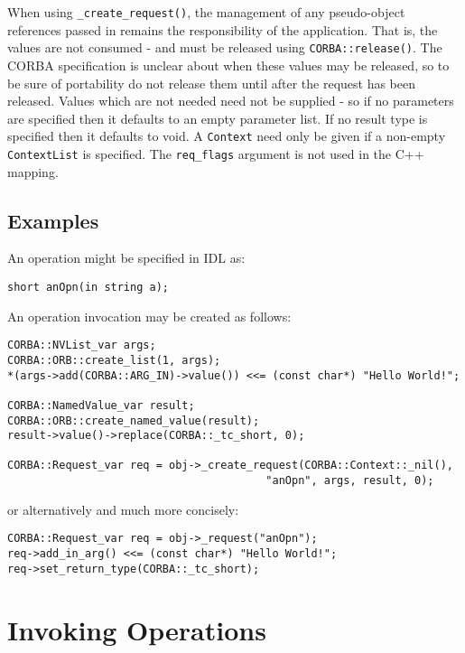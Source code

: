 \documentclass[11pt,twoside,onecolumn]{book}
\begin{document}
When using {\tt \_create\_request()}, the management of any pseudo-object
references passed in remains the responsibility of the application. That is,
the values are not consumed - and must be released using
{\tt CORBA::release()}. The CORBA specification is unclear about when these
values may be released, so to be sure of portability do not release them
until after the request has been released.
Values which are not needed need not be supplied - so if no parameters are
specified then it defaults to an empty parameter list. If no result type is
specified then it defaults to void. A {\tt Context} need only be given if
a non-empty {\tt ContextList} is specified. The {\tt req\_flags} argument
is not used in the C++ mapping.


\subsection{Examples}

An operation might be specified in IDL as:

{\small \begin{verbatim}
short anOpn(in string a);
\end{verbatim}}

\noindent{}An operation invocation may be created as follows:

{\small \begin{verbatim}
CORBA::NVList_var args;
CORBA::ORB::create_list(1, args);
*(args->add(CORBA::ARG_IN)->value()) <<= (const char*) "Hello World!";

CORBA::NamedValue_var result;
CORBA::ORB::create_named_value(result);
result->value()->replace(CORBA::_tc_short, 0);

CORBA::Request_var req = obj->_create_request(CORBA::Context::_nil(),
                                        "anOpn", args, result, 0);
\end{verbatim}}

\noindent{}or alternatively and much more concisely:

{\small \begin{verbatim}
CORBA::Request_var req = obj->_request("anOpn");
req->add_in_arg() <<= (const char*) "Hello World!";
req->set_return_type(CORBA::_tc_short);
\end{verbatim}}


\section{Invoking Operations}
\label{dii_invoke}
\end{document}
